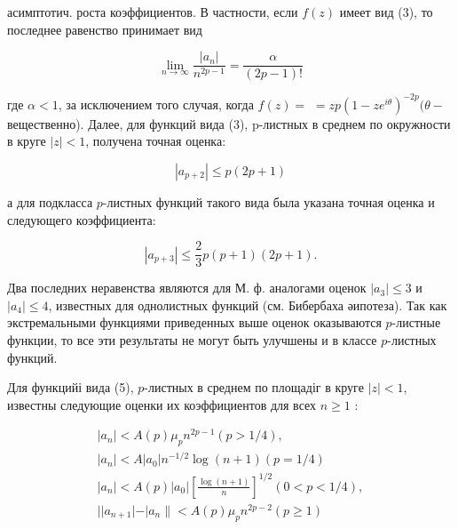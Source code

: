 \documentclass[10pt]{article}
\begin{document}
асимптотич. роста коэффициентов. В частности, если $f(z)$ имеет вид (3), то последнее равенство принимает вид



\[

\lim _{n \rightarrow \infty} \frac{\left|a_{n}\right|}{n^{2 p-1}}=\frac{\alpha}{(2 p-1) !}

\]



где $\alpha<1$, за исключением того случая, когда $f(z)=$ $=z p\left(1-z e^{i \theta}\right)^{-2 p}(\theta-$ вещественно). Далее, для функций вида (3), p-листных в среднем по окружности в круге $|z|<1$, получена точная оценка:



\[

\left|a_{p+2}\right| \leqslant p(2 p+1)

\]



а для подкласса $p$-листных функций такого вида была указана точная оценка и следующего коэффициента:



\[

\left|a_{p+3}\right| \leqslant \frac{2}{3} p(p+1)(2 p+1) .

\]



Два последних неравенства являются для М. ф. аналогами оценок $\left|a_{3}\right| \leqslant 3$ и $\left|a_{4}\right| \leqslant 4$, известных для однолистных функций (см. Бибербаха әипотеза). Так как экстремальными функциями приведенных выше оценок оказываются $p$-листные функции, то все эти результаты не могут быть улучшены и в классе $p$-листных функций.



Для функцийі вида (5), $p$-листных в среднем по площадіг в круге $|z|<1$, известны следующие оценки их коэффициентов для всех $n \geqslant 1$ :



\[

\begin{gathered}

\left|a_{n}\right|<A(p) \mu_{p} n^{2 p-1}(p>1 / 4), \\

\left|a_{n}\right|<A\left|a_{0}\right| n^{-1 / 2} \log (n+1)(p=1 / 4) \\

\left|a_{n}\right|<A(p)\left|a_{0}\right|\left[\frac{\log (n+1)}{n}\right]^{1 / 2}(0<p<1 / 4), \\

|| a_{n+1}|-| a_{n} \|<A(p) \mu_{p} n^{2 p-2}(p \geqslant 1)

\end{gathered}

\]
\end{document}
